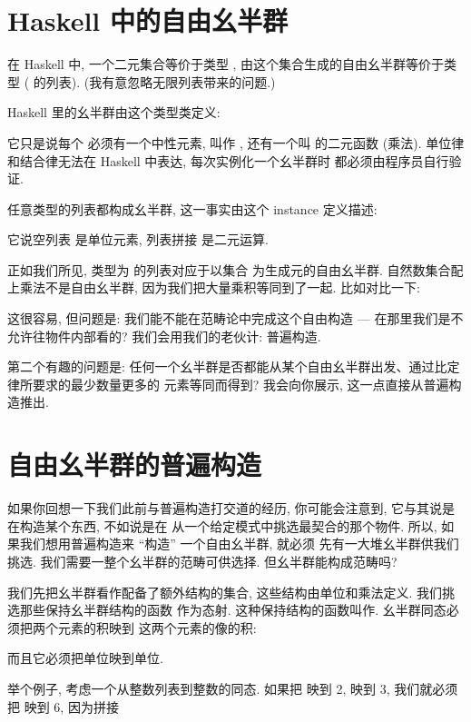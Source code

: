 \section{Haskell 中的自由幺半群}

在 Haskell 中, 一个二元集合等价于类型 , 由这个集合生成的自由幺半群等价于类型
\code{{[}Bool{]}} ( 的列表). (我有意忽略无限列表带来的问题.)

Haskell 里的幺半群由这个类型类定义:

它只是说每个  必须有一个中性元素, 叫作 , 还有一个叫
 的二元函数 (乘法). 单位律和结合律无法在 Haskell 中表达, 每次实例化一个幺半群时
都必须由程序员自行验证.

任意类型的列表都构成幺半群, 这一事实由这个 instance 定义描述:

它说空列表 \code{{[}{]}} 是单位元素, 列表拼接 \code{(++)} 是二元运算.

正如我们所见, 类型为  的列表对应于以集合  为生成元的自由幺半群.
自然数集合配上乘法不是自由幺半群, 因为我们把大量乘积等同到了一起. 比如对比一下:

这很容易, 但问题是: 我们能不能在范畴论中完成这个自由构造 --- 在那里我们是不允许往物件内部看的?
我们会用我们的老伙计: 普遍构造.

第二个有趣的问题是: 任何一个幺半群是否都能从某个自由幺半群出发、通过比定律所要求的最少数量更多的
元素等同而得到? 我会向你展示, 这一点直接从普遍构造推出.

\section{自由幺半群的普遍构造}

如果你回想一下我们此前与普遍构造打交道的经历, 你可能会注意到, 它与其说是在构造某个东西, 不如说是在
从一个给定模式中挑选最契合的那个物件. 所以, 如果我们想用普遍构造来 ``构造'' 一个自由幺半群, 就必须
先有一大堆幺半群供我们挑选. 我们需要一整个幺半群的范畴可供选择. 但幺半群能构成范畴吗?

我们先把幺半群看作配备了额外结构的集合, 这些结构由单位和乘法定义. 我们挑选那些保持幺半群结构的函数
作为态射. 这种保持结构的函数叫作. 幺半群同态必须把两个元素的积映到
这两个元素的像的积:

而且它必须把单位映到单位.

举个例子, 考虑一个从整数列表到整数的同态. 如果把 \code{{[}2{]}} 映到 2, \code{{[}3{]}} 映到
3, 我们就必须把 \code{{[}2, 3{]}} 映到 6, 因为拼接

